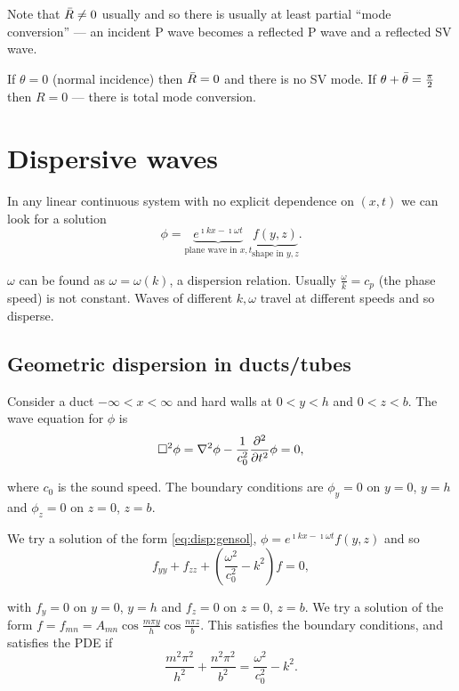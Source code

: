 \documentclass{notes}
\renewcommand{\Box}{\square}
\begin{document}
Note that $\Bar{R} \neq 0$ usually and so there is usually at least
partial ``mode conversion'' --- an incident P wave becomes a reflected
P wave and a reflected SV wave.

If $\theta = 0$ (normal incidence) then $\Bar{R} = 0$ and there is
no SV mode.  If $\theta + \Bar{\theta} = \tfrac{\pi}{2}$ then
$R = 0$ --- there is total mode conversion.

\chapter{Dispersive waves}

In any linear continuous system with no explicit dependence on $(x,t)$
we can look for a solution
\begin{equation}\label{eq:disp:gensol}
\phi = \underbrace{e^{\imath k x - \imath \omega t}}_{\text{plane wave
in $x,t$}}
\underbrace{f(y,z)}_{\text{shape in $y,z$}}.
\end{equation}

$\omega$ can be found as $\omega = \omega(k)$, a dispersion relation.
Usually $\tfrac{\omega}{k} = c_p$ (the phase speed) is not constant.
Waves of different $k,\omega$ travel at different speeds and so
disperse.

\section{Geometric dispersion in ducts/tubes}

\vspace{1.5in}

Consider a duct $-\infty < x < \infty$ and hard walls at $0 < y < h$
and $0 < z < b$.  The wave equation for $\phi$ is
\[
\Box^2 \phi = \nabla^2 \phi - \frac{1}{c_0^2} \pd{^2}{t^2} \phi = 0,
\]

where $c_0$ is the sound speed.  The boundary conditions are
$\phi_y = 0$ on $y=0$, $y=h$ and $\phi_z = 0$ on $z=0$, $z=b$.

We try a solution of the form \eqref{eq:disp:gensol},
$\phi = e^{\imath k x - \imath \omega t} f(y,z)$ and so
\[
f_{yy} + f_{zz} + \left( \frac{\omega^2}{c_0^2} - k^2 \right) f = 0,
\]

with $f_y = 0$ on $y=0$, $y=h$ and $f_z = 0$ on $z=0$, $z=b$.  We
try a solution of the form $f = f_{mn} = A_{mn} \cos \tfrac{m \pi y}{h}
\cos \tfrac{n \pi z}{b}$.  This satisfies the boundary conditions,
and satisfies the PDE if
\[
\frac{m^2 \pi^2}{h^2} + \frac{n^2 \pi^2}{b^2} = \frac{\omega^2}{c_0^2}
- k^2.
\]
\end{document}

